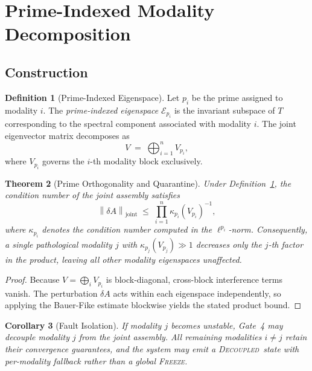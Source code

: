 \documentclass[11pt,a4paper]{article}
\theoremstyle{tealstyle}
\newtheorem{theorem}{Theorem}[section]
\newtheorem{corollary}[theorem]{Corollary}
\theoremstyle{definition}
\newtheorem{definition}[theorem]{Definition}
\newcommand{\norm}[1]{\left\lVert #1 \right\rVert}
\newcommand{\cond}{\kappa}
\newcommand{\freeze}{\textsc{Freeze}}
\newcommand{\decoupled}{\textsc{Decoupled}}
\newcommand{\dA}{\delta A}
\newcommand{\eigvec}{V}
\newcommand{\primed}{p}
\begin{document}
\section{Prime-Indexed Modality Decomposition}
\label{sec:prime}

\subsection{Construction}

\begin{definition}[Prime-Indexed Eigenspace]
\label{def:prime-eigenspace}
Let $\primed_i$ be the prime assigned to modality $i$.
The \emph{prime-indexed eigenspace} $\mathcal{E}_{p_i}$ is the invariant
subspace of $T$ corresponding to the spectral component associated with
modality $i$.
The joint eigenvector matrix decomposes as
\[
  \eigvec \;=\; \bigoplus_{i=1}^n \eigvec_{\primed_i},
\]
where $\eigvec_{\primed_i}$ governs the $i$-th modality block exclusively.
\end{definition}

\begin{theorem}[Prime Orthogonality and Quarantine]
\label{thm:prime-quarantine}
Under Definition~\ref{def:prime-eigenspace}, the condition number of the
joint assembly satisfies
\begin{equation}
  \label{eq:prime-bound}
  \norm{\dA}_{\mathrm{joint}}
  \;\le\; \prod_{i=1}^n \cond_{\primed_i}(\eigvec_{\primed_i})^{-1},
\end{equation}
where $\cond_{\primed_i}$ denotes the condition number computed in the
$\ell^{\primed_i}$-norm.
Consequently, a single pathological modality $j$ with
$\cond_{\primed_j}(\eigvec_{\primed_j}) \gg 1$
decreases only the $j$-th factor in the product, leaving all other modality
eigenspaces unaffected.
\end{theorem}

\begin{proof}
Because $\eigvec = \bigoplus_i \eigvec_{\primed_i}$ is block-diagonal,
cross-block interference terms vanish.
The perturbation $\dA$ acts within each eigenspace independently, so
applying the Bauer-Fike estimate blockwise yields the stated product bound.
\end{proof}

\begin{corollary}[Fault Isolation]
\label{cor:fault-isolation}
If modality $j$ becomes unstable, Gate~4 may decouple modality $j$ from the
joint assembly.
All remaining modalities $i \ne j$ retain their convergence guarantees,
and the system may emit a \decoupled\ state with per-modality fallback
rather than a global \freeze.
\end{corollary}
\end{document}
